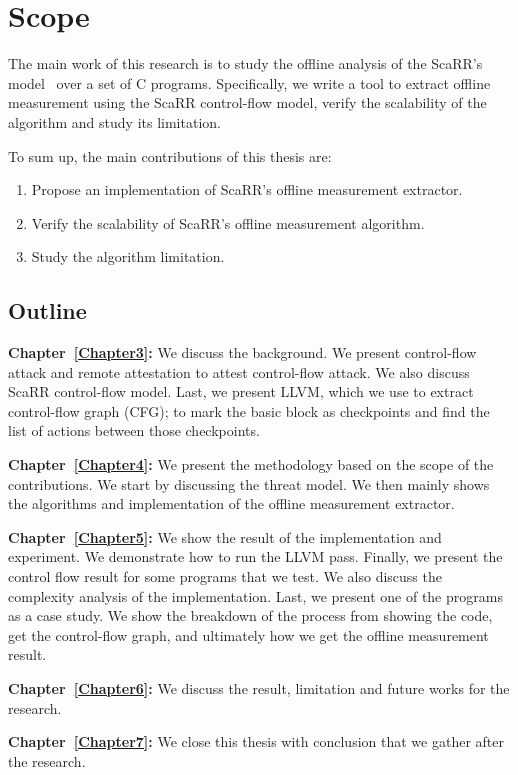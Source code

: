 
\chapter{Scope} %
\label{Chapter2} %

The main work of this research is to study the offline analysis of the ScaRR's
model~\cite{toffaliniScaRRScalableRuntime2019} over a set of C programs.
Specifically, we write a tool to extract offline measurement using the ScaRR
control-flow model, verify the scalability of the algorithm and study its
limitation.

To sum up, the main contributions of this thesis are:
\begin{enumerate}
	\item Propose an implementation of ScaRR's offline measurement extractor.
	\item Verify the scalability of ScaRR's offline measurement algorithm.
	\item Study the algorithm limitation.
\end{enumerate}

\section{Outline}
\label{sec:outline}

\vspace{0.5cm}
\noindent \textbf{Chapter~\ref{Chapter3}:} We discuss the background. We present
control-flow attack and remote attestation to attest control-flow attack. We
also discuss ScaRR control-flow model. Last, we present LLVM, which we use to
extract control-flow graph (CFG); to mark the basic block as checkpoints and
find the list of actions between those checkpoints.

\vspace{0.5cm}
\noindent \textbf{Chapter~\ref{Chapter4}:} We present the methodology based on
the scope of the contributions. We start by discussing the threat model. We then
mainly shows the algorithms and implementation of the offline measurement
extractor.

\vspace{0.5cm}
\noindent \textbf{Chapter~\ref{Chapter5}:} We show the result of the
implementation and experiment. We demonstrate how to run the LLVM pass. Finally,
we present the control flow result for some programs that we test. We also
discuss the complexity analysis of the implementation. Last, we present one of
the programs as a case study. We show the breakdown of the process from showing
the code, get the control-flow graph, and ultimately how we get the offline
measurement result.

\vspace{0.5cm}
\noindent \textbf{Chapter~\ref{Chapter6}:} We discuss the result, limitation and
future works for the research.

\vspace{0.5cm}
\noindent \textbf{Chapter~\ref{Chapter7}:} We close this thesis with conclusion
that we gather after the research.